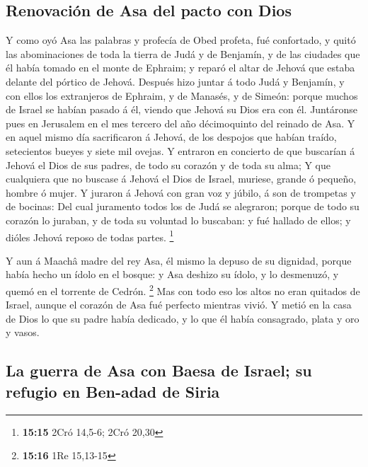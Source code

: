 \hypertarget{renovaciuxf3n-de-asa-del-pacto-con-dios}{%
\subsection{Renovación de Asa del pacto con
Dios}\label{renovaciuxf3n-de-asa-del-pacto-con-dios}}

 Y como oyó Asa las palabras y profecía de Obed profeta, fué
confortado, y quitó las abominaciones de toda la tierra de Judá y de
Benjamín, y de las ciudades que él había tomado en el monte de Ephraim;
y reparó el altar de Jehová que estaba delante del pórtico de Jehová.
 Después hizo juntar á todo Judá y Benjamín, y con ellos los
extranjeros de Ephraim, y de Manasés, y de Simeón: porque muchos de
Israel se habían pasado á él, viendo que Jehová su Dios era con él.
 Juntáronse pues en Jerusalem en el mes tercero del año
décimoquinto del reinado de Asa.  Y en aquel mismo día
sacrificaron á Jehová, de los despojos que habían traído, setecientos
bueyes y siete mil ovejas.  Y entraron en concierto de que
buscarían á Jehová el Dios de sus padres, de todo su corazón y de toda
su alma;  Y que cualquiera que no buscase á Jehová el Dios
de Israel, muriese, grande ó pequeño, hombre ó mujer.  Y
juraron á Jehová con gran voz y júbilo, á son de trompetas y de bocinas:
 Del cual juramento todos los de Judá se alegraron; porque
de todo su corazón lo juraban, y de toda su voluntad lo buscaban: y fué
hallado de ellos; y dióles Jehová reposo de todas partes. \footnote{\textbf{15:15}
  2Cró 14,5-6; 2Cró 20,30}

 Y aun á Maachâ madre del rey Asa, él mismo la depuso de su
dignidad, porque había hecho un ídolo en el bosque: y Asa deshizo su
ídolo, y lo desmenuzó, y quemó en el torrente de Cedrón. \footnote{\textbf{15:16}
  1Re 15,13-15}  Mas con todo eso los altos no eran
quitados de Israel, aunque el corazón de Asa fué perfecto mientras
vivió.  Y metió en la casa de Dios lo que su padre había
dedicado, y lo que él había consagrado, plata y oro y vasos.

\hypertarget{la-guerra-de-asa-con-baesa-de-israel-su-refugio-en-ben-adad-de-siria}{%
\subsection{La guerra de Asa con Baesa de Israel; su refugio en Ben-adad
de
Siria}\label{la-guerra-de-asa-con-baesa-de-israel-su-refugio-en-ben-adad-de-siria}}

